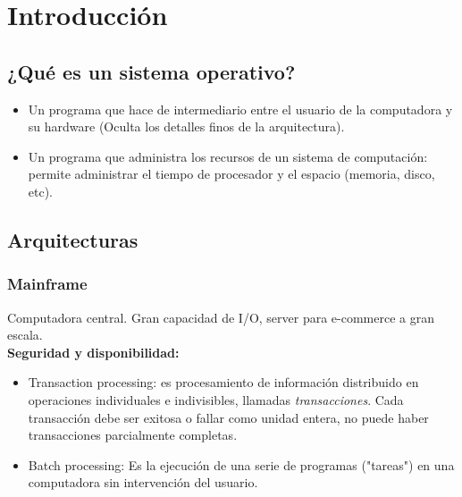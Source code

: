 \documentclass[a4paper, twoside]{article}
\newcommand{\rutapaquetes}{./paquetes-apunte}
\begin{document}
\maketitle %

\tableofcontents %


\section{Introducción}
\subsection{¿Qué es un sistema operativo?}
\begin{itemize}
	\item Un programa que hace de intermediario entre el usuario de la computadora y su hardware (Oculta los detalles finos de la arquitectura).
	\item Un programa que administra los recursos de un sistema de computación: permite administrar el tiempo de procesador y el espacio (memoria, disco, etc).
\end{itemize}

\subsection{Arquitecturas}
\subsubsection{Mainframe}
Computadora central. Gran capacidad de I/O, server para e-commerce a gran escala.\\

\textbf{Seguridad y disponibilidad:} 
\begin{itemize}
	\item Transaction processing: es procesamiento de información distribuido en operaciones individuales e indivisibles, llamadas \emph{transacciones}. Cada transacción debe ser exitosa o fallar como unidad entera, no puede haber transacciones parcialmente completas.
	\item Batch processing: Es la ejecución de una serie de programas ("tareas") en una computadora sin intervención del usuario.
\end{itemize}
\end{document}
